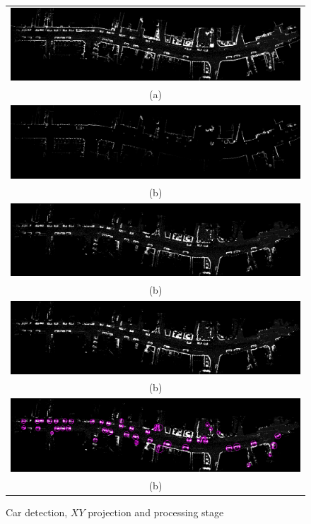 \begin{figure}[tp]
 \centering
    \begin{tabular}{c}
    \includegraphics[width=0.92\columnwidth]{./img/ch-laser/pointsprojected}\\
    (a)\\
  \includegraphics[width=0.92\columnwidth]{./img/ch-laser/heightimagePointsProjected_.png}\\
    (b)\\
  \includegraphics[width=0.92\columnwidth]{./img/ch-laser/pointsprojectedFiltered.png}\\
    (b)\\
  \includegraphics[width=0.92\columnwidth]{./img/ch-laser/pointsprojectedEroded.png}\\
    (b)\\
    \includegraphics[width=0.92\columnwidth]{./img/ch-laser/pointsprojectedErodedWithBoundingBoxes.png}\\
    (b)
 \end{tabular}
 \caption{Car detection, $XY$ projection and processing stage}
 \label{fig:cardetection}
\end{figure}




